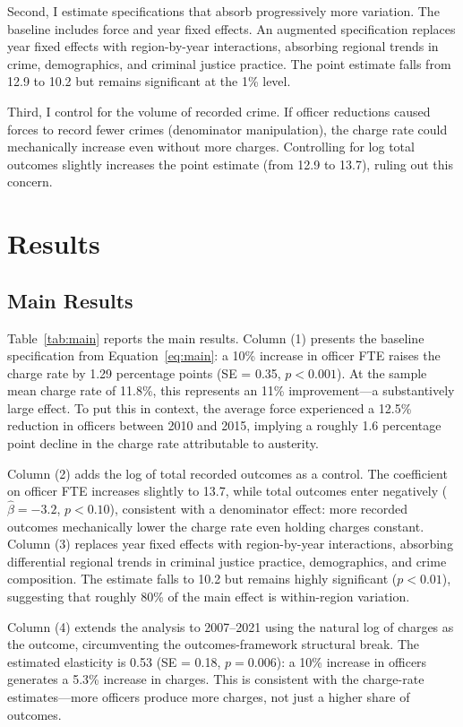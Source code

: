\documentclass[12pt]{article}
\begin{document}
Second, I estimate specifications that absorb progressively more variation. The baseline includes force and year fixed effects. An augmented specification replaces year fixed effects with region-by-year interactions, absorbing regional trends in crime, demographics, and criminal justice practice. The point estimate falls from 12.9 to 10.2 but remains significant at the 1\% level.

Third, I control for the volume of recorded crime. If officer reductions caused forces to record fewer crimes (denominator manipulation), the charge rate could mechanically increase even without more charges. Controlling for log total outcomes slightly increases the point estimate (from 12.9 to 13.7), ruling out this concern.


\section{Results}

\subsection{Main Results}



Table~\ref{tab:main} reports the main results. Column (1) presents the baseline specification from Equation~\ref{eq:main}: a 10\% increase in officer FTE raises the charge rate by 1.29 percentage points (SE = 0.35, $p < 0.001$). At the sample mean charge rate of 11.8\%, this represents an 11\% improvement---a substantively large effect. To put this in context, the average force experienced a 12.5\% reduction in officers between 2010 and 2015, implying a roughly 1.6 percentage point decline in the charge rate attributable to austerity.

Column (2) adds the log of total recorded outcomes as a control. The coefficient on officer FTE increases slightly to 13.7, while total outcomes enter negatively ($\hat{\beta} = -3.2$, $p < 0.10$), consistent with a denominator effect: more recorded outcomes mechanically lower the charge rate even holding charges constant. Column (3) replaces year fixed effects with region-by-year interactions, absorbing differential regional trends in criminal justice practice, demographics, and crime composition. The estimate falls to 10.2 but remains highly significant ($p < 0.01$), suggesting that roughly 80\% of the main effect is within-region variation.

Column (4) extends the analysis to 2007--2021 using the natural log of charges as the outcome, circumventing the outcomes-framework structural break. The estimated elasticity is 0.53 (SE = 0.18, $p = 0.006$): a 10\% increase in officers generates a 5.3\% increase in charges. This is consistent with the charge-rate estimates---more officers produce more charges, not just a higher share of outcomes.
\end{document}
